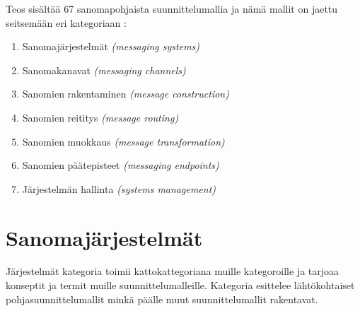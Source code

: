 Teos sisältää 67 sanomapohjaista suunnittelumallia ja nämä mallit on jaettu seitsemään eri kategoriaan \citep{Hohpe2004}:


\begin{enumerate}
   \item Sanomajärjestelmät \textit{(messaging systems)}
   \item Sanomakanavat \textit{(messaging channels)}
   \item Sanomien rakentaminen \textit{(message construction)}
   \item Sanomien reititys \textit{(message routing)}
   \item Sanomien muokkaus \textit{(message transformation)}
   \item Sanomien päätepisteet \textit{(messaging endpoints)}
   \item Järjestelmän hallinta \textit{(systems management)}
\end{enumerate}

\section{Sanomajärjestelmät}
Järjestelmät kategoria toimii kattokattegoriana muille kategoroille ja tarjoaa konseptit ja termit muille suunnittelumalleille. 
Kategoria esittelee lähtökohtaiset pohjasuunnittelumallit minkä päälle muut suunnittelumallit rakentavat.

